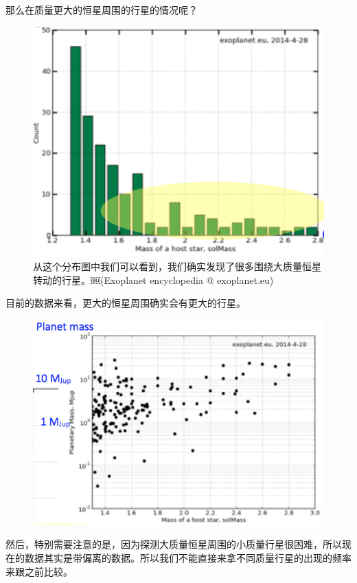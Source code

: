 \documentclass[letterpaper,10pt,english]{sphinxmanual}
\begin{document}
那么在质量更大的恒星周围的行星的情况呢？
\begin{figure}[htbp]
\centering
\capstart

\includegraphics{massOfHostStar.png}
\caption{从这个分布图中我们可以看到，我们确实发现了很多围绕大质量恒星转动的行星。￼(Exoplanet encyclopedia @ exoplanet.eu)}\end{figure}

目前的数据来看，更大的恒星周围确实会有更大的行星。
\begin{figure}[htbp]
\centering

\includegraphics{planetMassVSHostStar.png}
\end{figure}

然后，特别需要注意的是，因为探测大质量恒星周围的小质量行星很困难，所以现在的数据其实是带偏离的数据。所以我们不能直接来拿不同质量行星的出现的频率来跟之前比较。
\end{document}
